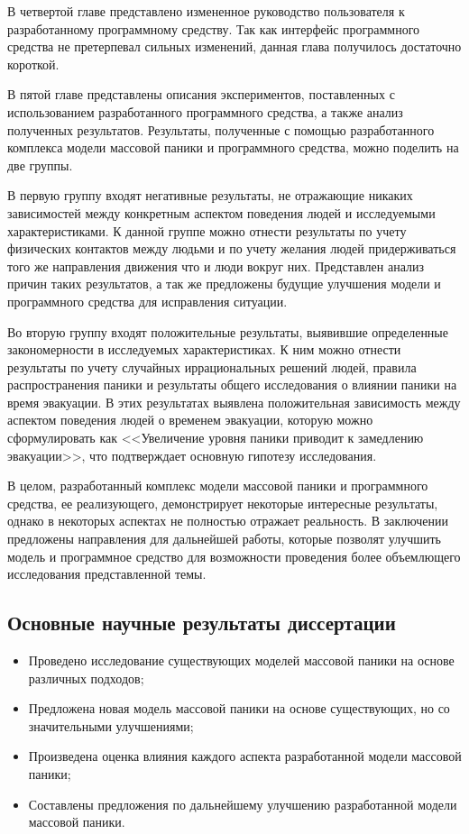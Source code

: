 В четвертой главе представлено измененное руководство пользователя к разработанному программному средству.
Так как интерфейс программного средства не претерпевал сильных изменений, данная глава получилось достаточно короткой.

В пятой главе представлены описания экспериментов, поставленных с использованием разработанного программного средства,
а также анализ полученных результатов. Результаты, полученные с помощью разработанного комплекса модели массовой паники и
программного средства, можно поделить на две группы.

В первую группу входят негативные результаты, не отражающие
никаких зависимостей между конкретным аспектом поведения людей и исследуемыми характеристиками.
К данной группе можно отнести результаты по учету физических контактов между людьми и по учету
желания людей придерживаться того же направления движения что и люди вокруг них.
Представлен анализ причин таких результатов, а так же предложены будущие улучшения модели и программного средства
для исправления ситуации.

Во вторую группу входят положительные результаты, выявившие определенные закономерности
в исследуемых характеристиках. К ним можно отнести результаты по учету случайных иррациональных решений
людей, правила распространения паники и результаты общего исследования о влиянии паники на время эвакуации.
В этих результатах выявлена положительная зависимость между аспектом поведения людей о временем эвакуации,
которую можно сформулировать как <<Увеличение уровня паники приводит к замедлению эвакуации>>,
что подтверждает основную гипотезу исследования.

В целом, разработанный комплекс модели массовой паники и программного средства, ее реализующего,
демонстрирует некоторые интересные результаты, однако в некоторых аспектах не полностью отражает реальность.
В заключении предложены направления для дальнейшей работы, которые позволят улучшить модель и программное средство
для возможности проведения более объемлющего исследования представленной темы.


\subsection*{\textbf{Основные научные результаты диссертации}}

\begin{itemize}
  \item Проведено исследование существующих моделей массовой паники на основе различных подходов;
  \item Предложена новая модель массовой паники на основе существующих, но со значительными улучшениями;
  \item Произведена оценка влияния каждого аспекта разработанной модели массовой паники;
  \item Составлены предложения по дальнейшему улучшению разработанной модели массовой паники.
\end{itemize}


\renewcommand{\bibsection}{\sectioncentered*{Список опубликованных работ}}


\nocite{mypub}
